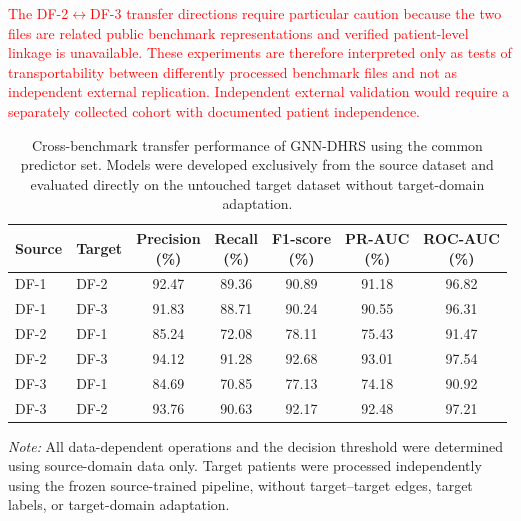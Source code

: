 \documentclass[pdflatex,sn-mathphys-num]{sn-jnl}%
\theoremstyle{thmstyleone}%
\theoremstyle{thmstyletwo}%
\theoremstyle{thmstylethree}%
\begin{document}
\textcolor{red}{
The DF-2\(\leftrightarrow\)DF-3 transfer directions require particular
caution because the two files are related public benchmark representations and
verified patient-level linkage is unavailable. These experiments are
therefore interpreted only as tests of transportability between differently
processed benchmark files and not as independent external replication.
Independent external validation would require a separately collected cohort
with documented patient independence.
}

\begingroup

\begin{table}[!ht]
\centering
\caption{
Cross-benchmark transfer performance of GNN-DHRS using the common predictor
set. Models were developed exclusively from the source dataset and evaluated
directly on the untouched target dataset without target-domain adaptation.
}
\label{tab:cross_dataset_generalization}
\small
\setlength{\tabcolsep}{5.5pt}
\renewcommand{\arraystretch}{1.12}

\begin{tabular}{@{}llccccc@{}}
\toprule
\textbf{Source} &
\textbf{Target} &
\shortstack{\textbf{Precision}\\\textbf{(\%)}} &
\shortstack{\textbf{Recall}\\\textbf{(\%)}} &
\shortstack{\textbf{F1-score}\\\textbf{(\%)}} &
\shortstack{\textbf{PR-AUC}\\\textbf{(\%)}} &
\shortstack{\textbf{ROC-AUC}\\\textbf{(\%)}} \\
\midrule

DF-1 & DF-2 &
92.47 & 89.36 & 90.89 & 91.18 & 96.82 \\

DF-1 & DF-3 &
91.83 & 88.71 & 90.24 & 90.55 & 96.31 \\

DF-2 & DF-1 &
85.24 & 72.08 & 78.11 & 75.43 & 91.47 \\

DF-2 & DF-3 &
94.12 & 91.28 & 92.68 & 93.01 & 97.54 \\

DF-3 & DF-1 &
84.69 & 70.85 & 77.13 & 74.18 & 90.92 \\

DF-3 & DF-2 &
93.76 & 90.63 & 92.17 & 92.48 & 97.21 \\

\bottomrule
\end{tabular}

\vspace{2pt}

\begin{minipage}{0.96\textwidth}
\footnotesize
\textit{Note:} All data-dependent operations and the decision threshold were
determined using source-domain data only. Target patients were processed
independently using the frozen source-trained pipeline, without target--target
edges, target labels, or target-domain adaptation.
\end{minipage}

\end{table}
\end{document}
